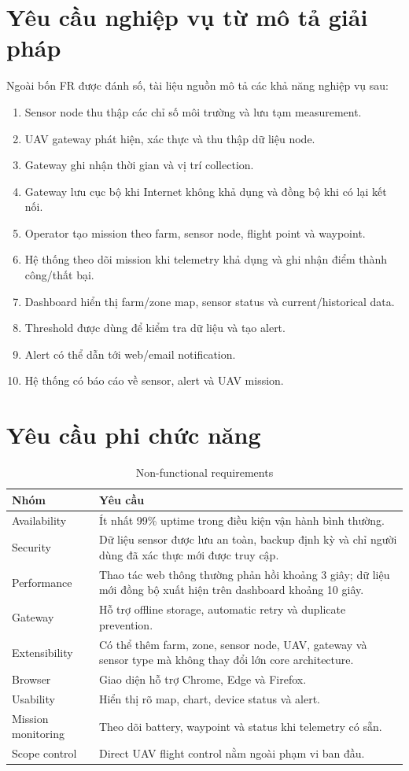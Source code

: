 \section{Yêu cầu nghiệp vụ từ mô tả giải pháp}
Ngoài bốn FR được đánh số, tài liệu nguồn mô tả các khả năng nghiệp vụ sau:
\begin{enumerate}
  \item Sensor node thu thập các chỉ số môi trường và lưu tạm measurement.
  \item UAV gateway phát hiện, xác thực và thu thập dữ liệu node.
  \item Gateway ghi nhận thời gian và vị trí collection.
  \item Gateway lưu cục bộ khi Internet không khả dụng và đồng bộ khi có lại kết nối.
  \item Operator tạo mission theo farm, sensor node, flight point và waypoint.
  \item Hệ thống theo dõi mission khi telemetry khả dụng và ghi nhận điểm thành công/thất bại.
  \item Dashboard hiển thị farm/zone map, sensor status và current/historical data.
  \item Threshold được dùng để kiểm tra dữ liệu và tạo alert.
  \item Alert có thể dẫn tới web/email notification.
  \item Hệ thống có báo cáo về sensor, alert và UAV mission.
\end{enumerate}

\section{Yêu cầu phi chức năng}
\begin{longtable}{p{3.8cm}p{10cm}}
\caption{Non-functional requirements}\label{tab:nfr}\\
\toprule
Nhóm & Yêu cầu \\
\midrule
Availability & Ít nhất 99\% uptime trong điều kiện vận hành bình thường.\\
Security & Dữ liệu sensor được lưu an toàn, backup định kỳ và chỉ người dùng đã xác thực mới được truy cập.\\
Performance & Thao tác web thông thường phản hồi khoảng 3 giây; dữ liệu mới đồng bộ xuất hiện trên dashboard khoảng 10 giây.\\
Gateway & Hỗ trợ offline storage, automatic retry và duplicate prevention.\\
Extensibility & Có thể thêm farm, zone, sensor node, UAV, gateway và sensor type mà không thay đổi lớn core architecture.\\
Browser & Giao diện hỗ trợ Chrome, Edge và Firefox.\\
Usability & Hiển thị rõ map, chart, device status và alert.\\
Mission monitoring & Theo dõi battery, waypoint và status khi telemetry có sẵn.\\
Scope control & Direct UAV flight control nằm ngoài phạm vi ban đầu.\\
\bottomrule
\end{longtable}

